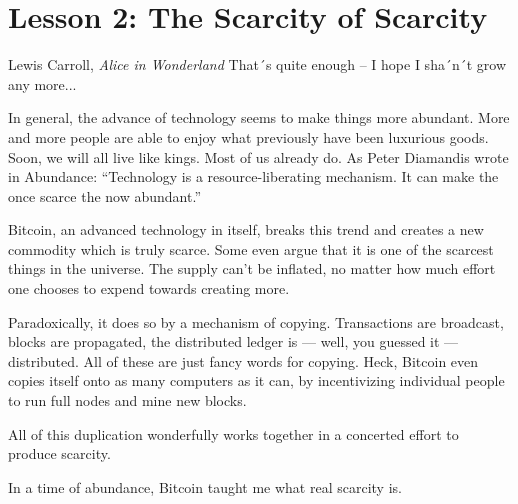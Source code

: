 
\chapter{Lesson 2: The Scarcity of Scarcity}
\label{les:2}

\begin{chapquote}{Lewis Carroll, \textit{Alice in Wonderland}}
That´s quite enough -- I hope I sha´n´t grow any more...
\end{chapquote}

In general, the advance of technology seems to make things more abundant. More
and more people are able to enjoy what previously have been luxurious goods.
Soon, we will all live like kings. Most of us already do. As Peter Diamandis
wrote in Abundance\cite{diamandis2012abundance}: ``Technology is a
resource-liberating mechanism. It can make the once scarce the now abundant.''

Bitcoin, an advanced technology in itself, breaks this trend and creates
a new commodity which is truly scarce. Some even argue that it is one of
the scarcest things in the universe. The supply can't be inflated, no
matter how much effort one chooses to expend towards creating more.


Paradoxically, it does so by a mechanism of copying. Transactions are
broadcast, blocks are propagated, the distributed ledger is --- well,
you guessed it --- distributed. All of these are just fancy words for
copying. Heck, Bitcoin even copies itself onto as many computers as it
can, by incentivizing individual people to run full nodes and mine new
blocks.

All of this duplication wonderfully works together in a concerted effort
to produce scarcity.

In a time of abundance, Bitcoin taught me what real scarcity is.

